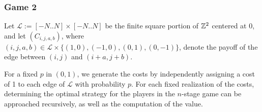         \subsubsection*{Game 2}
        Let $\mathcal{L} := [-N..N] \times [-N..N]$ be the finite square portion of $\mathbb{Z}^2$ centered at $0$, and let $(C_{i, j, a, b})$, where $(i, j, a, b) \in \mathcal{L} \times \{ (1, 0), (-1, 0), (0, 1), (0, -1)\}$, denote the payoff of the edge between $(i, j)$ and $(i + a, j + b)$. 

        For a fixed $p$ in $(0, 1)$, we generate the costs by independently assigning a cost of 1 to each edge of $\mathcal{L}$ with probability $p$. For each fixed realization of the costs, determining the optimal strategy for the players in the $n$-stage game can be approached recursively, as well as the computation of the value. 

